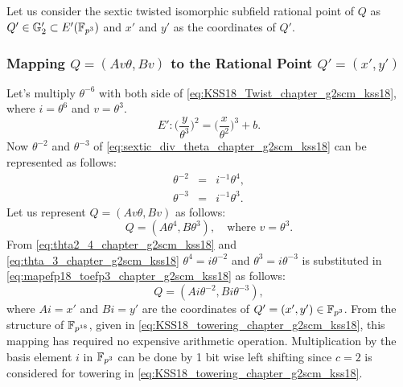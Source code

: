 Let us consider the sextic twisted isomorphic subfield rational point of $Q$ as $Q' \in {\mathbb{G}}_{2}' \subset E'({\mathbb{F}}_{p^{3}})$ and $x'$ and $y'$ as the coordinates of $Q'$.

\subsubsection{Mapping \texorpdfstring{$Q = (Av\theta, Bv)$}{}  to the Rational Point  \texorpdfstring{$Q' = (x',y')$}{}}

Let's multiply  $\theta^{-6}$ with both side of \eqref{eq:KSS18_Twist_chapter_g2scm_kss18}, where $i=\theta^6$ and $v = \theta^3$.
\begin{equation}\label{eq:sextic_div_theta_chapter_g2scm_kss18}
E':  \Big(\frac{y}{\theta^3}\Big)^2  = \Big(\frac{x}{\theta^2}\Big)^3+ b.
\end{equation}
Now $\theta^{-2}$ and $\theta^{-3}$ of  \eqref{eq:sextic_div_theta_chapter_g2scm_kss18} can be represented as follows:
\begin{subequations}
	\begin{eqnarray}
	\theta^{-2} &  = & i^{-1}\theta^{4}, \label{eq:thta2_4_chapter_g2scm_kss18} \\
	\theta^{-3} &  = & i^{-1}\theta^{3}.\label{eq:thta_3_chapter_g2scm_kss18} 
	\end{eqnarray}
\end{subequations}
Let us represent $Q = (Av\theta, Bv)$  as follows:
\begin{equation}\label{eq:mapefp18_toefp3_chapter_g2scm_kss18}
Q  =  (A\theta^4, B\theta^3), \quad \text{where $v=\theta^3$}.
\end{equation}
From \eqref{eq:thta2_4_chapter_g2scm_kss18} and \eqref{eq:thta_3_chapter_g2scm_kss18} $ \theta^4 = i\theta^{-2}$ and $\theta^3 = i\theta^{-3}$  is substituted in \eqref{eq:mapefp18_toefp3_chapter_g2scm_kss18}  as 
follows:
\begin{equation}\label{eq:mapefp18_toefp3_chapter_g2scm_kss18.1}
Q  =  (Ai\theta^{-2}, Bi\theta^{-3}),
\end{equation}
where $Ai = x'$ and $Bi = y'$ are the coordinates of $Q' =(x',y') \in \mathbb{F}_{p^3}$. 
From the structure of $\mathbb{F}_{p^{18}}$, given in \ref{eq:KSS18_towering_chapter_g2scm_kss18}, this mapping has required no expensive arithmetic operation. Multiplication by the basis element $i$ in $\mathbb{F}_{p^3}$ can be done by 1 bit wise left shifting since $c=2$ is considered for towering in \ref{eq:KSS18_towering_chapter_g2scm_kss18}.


